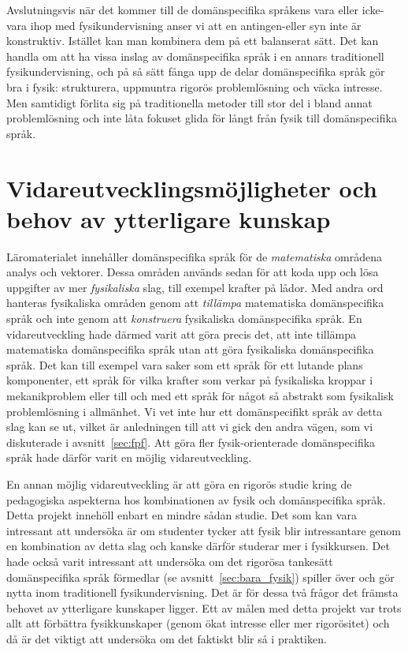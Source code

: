 Avslutningsvis när det kommer till de domänspecifika språkens vara eller icke-vara
ihop med fysikundervisning anser vi att en antingen-eller syn inte är konstruktiv.
Istället kan man kombinera dem på ett balanserat sätt. Det kan handla om att ha
vissa inslag av domänspecifika språk i en annars traditionell fysikundervisning,
och på så sätt fånga upp de delar domänspecifika språk gör bra i fysik:
strukturera, uppmuntra rigorös problemlösning och väcka intresse. Men samtidigt
förlita sig på traditionella metoder till stor del i bland annat problemlösning
och inte låta fokuset glida för långt från fysik till domänspecifika språk.

\section{Vidareutvecklingsmöjligheter och behov av ytterligare kunskap}

Läromaterialet innehåller domänspecifika språk för de \textit{matematiska}
områdena analys och vektorer. Dessa områden används sedan för att koda upp och
lösa uppgifter av mer \textit{fysikaliska} slag, till exempel krafter på lådor. Med andra ord hanteras fysikaliska områden genom att \textit{tillämpa} matematiska domänspecifika språk och inte genom att \textit{konstruera} fysikaliska domänspecifika språk. En vidareutveckling
hade därmed varit att göra precis det, att inte tillämpa matematiska
domänspecifika språk utan att göra fysikaliska domänspecifika språk. Det kan till exempel vara
saker som ett språk för ett lutande plans komponenter, ett språk för vilka krafter som verkar på fysikaliska kroppar i mekanikproblem eller till och med ett språk för något så abstrakt som
fysikalisk problemlösning i allmänhet. Vi vet inte hur ett domänspecifikt språk
av detta slag kan se ut, vilket är anledningen till att vi gick den andra vägen,
som vi diskuterade i avsnitt~\ref{sec:fpf}. Att göra fler fysik-orienterade
domänspecifika språk hade därför varit en möjlig vidareutveckling.

En annan möjlig vidareutveckling är att göra en rigorös studie kring de
pedagogiska aspekterna hos kombinationen av fysik och domänspecifika språk.
Detta projekt innehöll enbart en mindre sådan studie. Det som kan vara
intressant att undersöka är om studenter tycker att fysik blir intressantare
genom en kombination av detta slag och kanske därför studerar mer i fysikkursen.
Det hade också varit intressant att undersöka om det rigorösa tankesätt
domänspecifika språk förmedlar (se avsnitt~\ref{sec:bara_fysik}) spiller över och
gör nytta inom traditionell fysikundervisning. Det är för dessa två frågor det
främsta behovet av ytterligare kunskaper ligger. Ett av målen med detta projekt var trots allt att förbättra fysikkunskaper (genom ökat intresse eller mer
rigorösitet) och då är det viktigt att undersöka om det faktiskt blir
så i praktiken.

